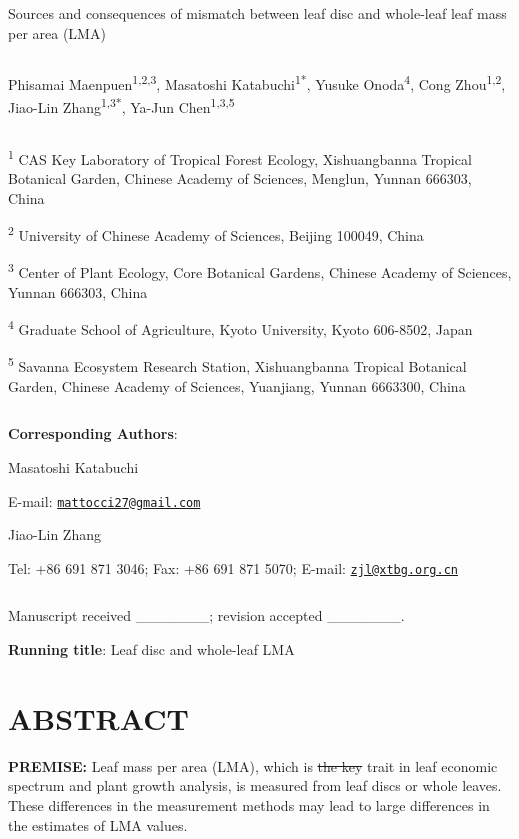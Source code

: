 \documentclass[
  12pt,
  a4paper,
,tablecaptionabove
]{scrartcl}
\date{}
\title{}
\author{}
\providecommand{\DIFaddtex}[1]{{\protect\color{blue}\uwave{#1}}} %
\providecommand{\DIFdeltex}[1]{{\protect\color{red}\sout{#1}}}                      %
\providecommand{\DIFaddbegin}{} %
\providecommand{\DIFaddend}{} %
\providecommand{\DIFdelbegin}{} %
\providecommand{\DIFdelend}{} %
\providecommand{\DIFadd}[1]{\texorpdfstring{\DIFaddtex{#1}}{#1}} %
\providecommand{\DIFdel}[1]{\texorpdfstring{\DIFdeltex{#1}}{}} %
\newcommand{\DIFscaledelfig}{0.5}
\newlength{\DIFdelgraphicswidth} %
\newlength{\DIFdelgraphicsheight} %
\newcommand{\DIFaddincludegraphics}[2][]{{\color{blue}\fbox{\DIFOincludegraphics[#1]{#2}}}} %
\newcommand{\DIFdelincludegraphics}[2][]{%
\sbox{\DIFdelgraphicsbox}{\DIFOincludegraphics[#1]{#2}}%
\settoboxwidth{\DIFdelgraphicswidth}{\DIFdelgraphicsbox} %
\settoboxtotalheight{\DIFdelgraphicsheight}{\DIFdelgraphicsbox} %
\scalebox{\DIFscaledelfig}{%
\parbox[b]{\DIFdelgraphicswidth}{\usebox{\DIFdelgraphicsbox}\\[-\baselineskip] \rule{\DIFdelgraphicswidth}{0em}}\llap{\resizebox{\DIFdelgraphicswidth}{\DIFdelgraphicsheight}{%
\setlength{\unitlength}{\DIFdelgraphicswidth}%
\begin{picture}(1,1)%
\thicklines\linethickness{2pt} %
{\color[rgb]{1,0,0}\put(0,0){\framebox(1,1){}}}%
{\color[rgb]{1,0,0}\put(0,0){\line( 1,1){1}}}%
{\color[rgb]{1,0,0}\put(0,1){\line(1,-1){1}}}%
\end{picture}%
}\hspace*{3pt}}} %
} %
\DeclareRobustCommand{\DIFaddbegin}{\DIFOaddbegin \let\includegraphics\DIFaddincludegraphics} %
\DeclareRobustCommand{\DIFaddend}{\DIFOaddend \let\includegraphics\DIFOincludegraphics} %
\DeclareRobustCommand{\DIFdelbegin}{\DIFOdelbegin \let\includegraphics\DIFdelincludegraphics} %
\DeclareRobustCommand{\DIFdelend}{\DIFOaddend \let\includegraphics\DIFOincludegraphics} %
\begin{document}




Sources and consequences of mismatch between leaf disc and whole-leaf leaf mass per area (LMA)

\[ \]

Phisamai Maenpuen\textsuperscript{1,2,3},
Masatoshi Katabuchi\textsuperscript{1*},
Yusuke Onoda\textsuperscript{4},
Cong Zhou\textsuperscript{1,2},
Jiao-Lin Zhang\textsuperscript{1,3*},
Ya-Jun Chen\textsuperscript{1,3,5}

\[ \]

\textsuperscript{1} CAS Key Laboratory of Tropical Forest Ecology, Xishuangbanna Tropical Botanical Garden, Chinese Academy of Sciences, Menglun, Yunnan 666303, China

\textsuperscript{2} University of Chinese Academy of Sciences, Beijing 100049, China

\textsuperscript{3} Center of Plant Ecology, Core Botanical Gardens, Chinese Academy of Sciences, Yunnan 666303, China

\textsuperscript{4} Graduate School of Agriculture, Kyoto University, Kyoto 606-8502, Japan

\textsuperscript{5} Savanna Ecosystem Research Station, Xishuangbanna Tropical Botanical Garden, Chinese Academy of Sciences, Yuanjiang, Yunnan 6663300, China

\[ \]

\textbf{Corresponding Authors}:

Masatoshi Katabuchi

E-mail: \href{mailto:mattocci27@gmail.com}{\nolinkurl{mattocci27@gmail.com}}

Jiao-Lin Zhang

Tel: +86 691 871 3046;
Fax: +86 691 871 5070;
E-mail: \href{mailto:zjl@xtbg.org.cn}{\nolinkurl{zjl@xtbg.org.cn}}

\[ \]

Manuscript received \_\_\_\_\_\_\_; revision accepted \_\_\_\_\_\_\_.

\textbf{Running title}: Leaf disc and whole-leaf LMA

\newpage

\hypertarget{abstract}{%
\section{ABSTRACT}\label{abstract}}

\textbf{PREMISE:}
Leaf mass per area (LMA), which is \DIFdelbegin \DIFdel{the key }\DIFdelend \DIFaddbegin \DIFadd{an important functional }\DIFaddend trait in leaf economic spectrum and plant growth analysis, is measured from leaf discs or whole leaves.
These differences in the measurement methods may lead to large differences in the estimates of LMA values.
\end{document}
